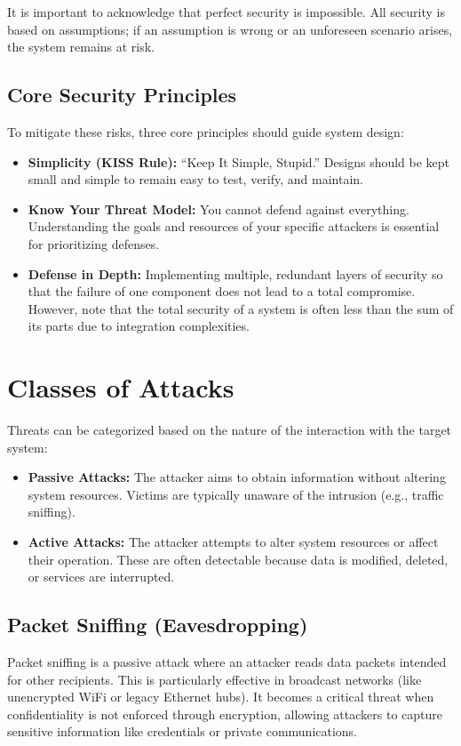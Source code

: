It is important to acknowledge that perfect security is impossible. All security is based on assumptions; if an assumption is wrong or an unforeseen scenario arises, the system remains at risk.

\subsection{Core Security Principles}
To mitigate these risks, three core principles should guide system design:
\begin{itemize}
    \item \textbf{Simplicity (KISS Rule):} ``Keep It Simple, Stupid.'' Designs should be kept small and simple to remain easy to test, verify, and maintain.
    \item \textbf{Know Your Threat Model:} You cannot defend against everything. Understanding the goals and resources of your specific attackers is essential for prioritizing defenses.
    \item \textbf{Defense in Depth:} Implementing multiple, redundant layers of security so that the failure of one component does not lead to a total compromise. However, note that the total security of a system is often less than the sum of its parts due to integration complexities.
\end{itemize}

\section{Classes of Attacks}

Threats can be categorized based on the nature of the interaction with the target system:
\begin{itemize}
    \item \textbf{Passive Attacks:} The attacker aims to obtain information without altering system resources. Victims are typically unaware of the intrusion (e.g., traffic sniffing).
    \item \textbf{Active Attacks:} The attacker attempts to alter system resources or affect their operation. These are often detectable because data is modified, deleted, or services are interrupted.
\end{itemize}

\subsection{Packet Sniffing (Eavesdropping)}
Packet sniffing is a passive attack where an attacker reads data packets intended for other recipients. This is particularly effective in broadcast networks (like unencrypted WiFi or legacy Ethernet hubs). It becomes a critical threat when confidentiality is not enforced through encryption, allowing attackers to capture sensitive information like credentials or private communications.

